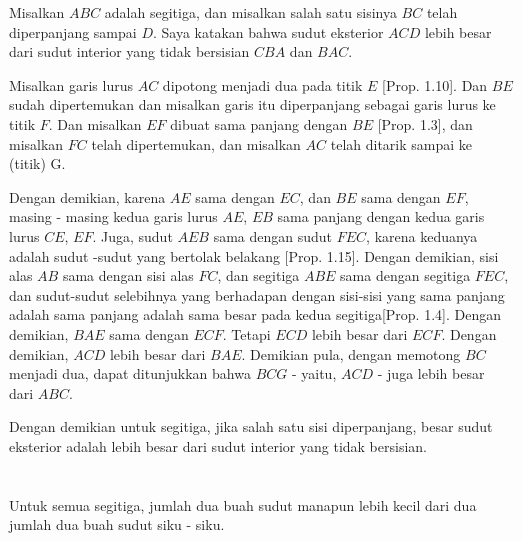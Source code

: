 \documentclass[a4paper]{book}
\begin{document}
\begin{center}
\end{center}
Misalkan $ABC$ adalah segitiga, dan misalkan salah satu sisinya $BC$ telah 
diperpanjang sampai $D$.  Saya katakan bahwa sudut eksterior $ACD$ lebih besar 
dari sudut interior yang tidak bersisian $CBA$ dan $BAC$.

Misalkan garis lurus $AC$ dipotong menjadi dua pada titik $E$ [Prop. 1.10]. 
Dan $BE$ sudah dipertemukan dan misalkan garis itu diperpanjang sebagai 
garis lurus ke titik $F$. 
Dan misalkan $EF$ dibuat sama panjang dengan $BE$ [Prop. 1.3], 
dan misalkan $FC$ telah dipertemukan, 
dan misalkan $AC$ telah ditarik sampai ke (titik) G.

Dengan demikian, karena $AE$ sama dengan $EC$, dan $BE$ sama dengan $EF$,
masing - masing kedua garis lurus $AE$, $EB$ sama panjang dengan kedua 
garis lurus $CE$, $EF$. Juga, sudut $AEB$ sama dengan sudut $FEC$, karena
keduanya adalah sudut -sudut yang bertolak belakang [Prop. 1.15]. 
Dengan demikian, sisi alas $AB$ sama dengan sisi alas $FC$, dan segitiga 
$ABE$ sama dengan segitiga $FEC$, dan sudut-sudut selebihnya yang berhadapan
dengan sisi-sisi yang sama panjang adalah sama panjang adalah sama besar
pada kedua segitiga[Prop. 1.4]. Dengan demikian, $BAE$ sama dengan $ECF$. 
Tetapi $ECD$ lebih besar dari $ECF$. Dengan demikian, $ACD$ lebih besar 
dari $BAE$. 
Demikian pula, dengan memotong $BC$ menjadi dua, dapat ditunjukkan 
bahwa $BCG$ - yaitu, $ACD$ - juga lebih besar dari $ABC$.  

Dengan demikian untuk segitiga, jika salah satu sisi diperpanjang, 
besar sudut eksterior adalah lebih besar dari sudut interior yang 
tidak bersisian.  

\section*{\centering \thesection} 
Untuk semua segitiga, jumlah dua buah sudut manapun lebih kecil dari
dua jumlah dua buah sudut siku - siku.
\begin{center}
\end{center}
\end{document}
